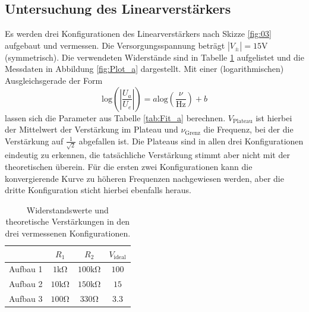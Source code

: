 \subsection{Untersuchung des Linearverstärkers}
Es werden drei Konfigurationen des Linearverstärkers nach Skizze \ref{fig:03} aufgebaut und vermessen. Die Versorgungsspannung beträgt $\left|V_{\pm}\right|=15\si{\volt}$ (symmetrisch). Die verwendeten Widerstände sind in Tabelle \ref{tab:Data_a} aufgelistet und die Messdaten in Abbildung \ref{fig:Plot_a} dargestellt. Mit einer (logarithmischen) Ausgleichsgerade der Form
\begin{equation}
  \text{log}\left(\left|\frac{U_a}{U_e}\right|\right) = a\text{log}\left(\frac{\nu}{\text{Hz}}\right) + b
  \label{eqn:log_fit}
\end{equation}
lassen sich die Parameter aus Tabelle \ref{tab:Fit_a} berechnen. $V_{\text{Plateau}}$ ist hierbei der Mittelwert der Verstärkung im Plateau und $\nu_{\text{Grenz}}$ die Frequenz, bei der die Verstärkung auf $\frac{1}{\sqrt{2}}$ abgefallen ist.
Die Plateaus sind in allen drei Konfigurationen eindeutig zu erkennen, die tatsächliche Verstärkung stimmt aber nicht mit der theoretischen überein. Für die ersten zwei Konfigurationen kann die konvergierende Kurve zu höheren Frequenzen nachgewiesen werden, aber die dritte Konfiguration sticht hierbei ebenfalls heraus.
\FloatBarrier
\begin{table}
  \centering
  \caption{Widerstandswerte und theoretische Verstärkungen in den drei vermessenen Konfigurationen.}
  \label{tab:Data_a}
  \begin{tabular}{c|ccc}
    \toprule
              & $R_1$              & $R_2$               & $V_{\text{ideal}}$\\
    \midrule
    Aufbau 1  & $1\si{\kilo\ohm}$  & $100\si{\kilo\ohm}$ & $100$\\
    Aufbau 2  & $10\si{\kilo\ohm}$ & $150\si{\kilo\ohm}$ & $15$\\
    Aufbau 3  & $100\si{\ohm}$     & $330\si{\ohm}$      & $3.3$\\
    \bottomrule
  \end{tabular}
\end{table}
\FloatBarrier
\FloatBarrier
